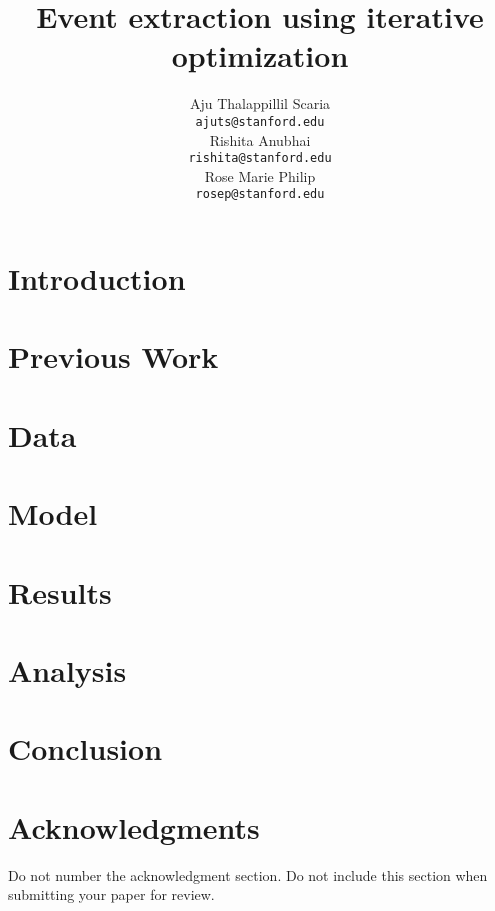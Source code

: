 \documentclass[11pt]{article}
\title{Event extraction using iterative optimization}
\author{
   Aju Thalappillil Scaria \\
  {\tt ajuts@stanford.edu} \\\And
  Rishita Anubhai \\
  {\tt rishita@stanford.edu} \\\And
  Rose Marie Philip \\
  {\tt rosep@stanford.edu} 
\\}
\date{}
\begin{document}
\maketitle
\begin{abstract}

\end{abstract}

\section{Introduction}
\label{sec:introduction}


\section{Previous Work}
\label{sec:previousapproaches}


\section{Data}
\label{sec:data}


\section{Model}
\label{sec:model}

\label{sec:model}

\label{sec:model}

\label{sec:model}

\label{sec:model}


\section{Results}
\label{sec:results}


\section{Analysis}
\label{sec:analysis}


\section{Conclusion}
\label{sec:conclusion}


\section*{Acknowledgments}

Do not number the acknowledgment section. Do not include this section when submitting your paper for review.
\end{document}
